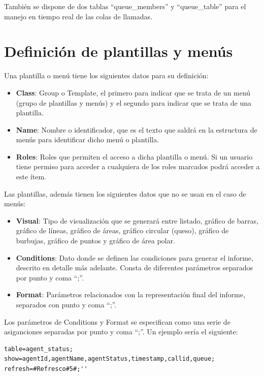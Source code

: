 \documentclass[spanish,12pt]{book}
\begin{document}
También se dispone de dos tablas ``queue\_members'' y ``queue\_table'' para el manejo en tiempo real de las colas de llamadas.

\section{Definición de plantillas y menús}
Una plantilla o menú tiene los siguientes datos para su definición:
\begin{itemize}
\item {\bf Class}: Group o Template, el primero para indicar que se trata de un menú (grupo de plantillas y menús) y el segundo para indicar que se trata de una plantilla.
\item {\bf Name}: Nombre o identificador, que es el texto que saldrá en la estructura de menús para identificar dicho menú o plantilla.
\item {\bf Roles}: Roles que permiten el acceso a dicha plantilla o menú. Si un usuario tiene permiso para acceder a cualquiera de los roles marcados podrá acceder a este ítem.
\end{itemize}

Las plantillas, además tienen los siguientes datos que no se usan en el caso de menús:
\begin{itemize}
\item {\bf Visual}: Tipo de visualización que se generará entre listado, gráfico de barras, gráfico de líneas, gráfico de áreas, gráfico circular (queso), gráfico de burbujas, gráfico de puntos y gráfico de área polar.
\item {\bf Conditions}: Dato donde se definen las condiciones para generar el informe, descrito en detalle más adelante. Consta de diferentes parámetros separados por punto y coma ``;''.
\item {\bf Format}: Parámetros relacionados con la representación final del informe, separados con punto y coma ``;''.
\end{itemize}

Los parámetros de Conditions y Format se especifican como una serie de asiganciones separadas por punto y coma ``;''. Un ejemplo sería el siguiente:
\begin{lstlisting}
table=agent_status;
show=agentId,agentName,agentStatus,timestamp,callid,queue;
refresh=#Refresco#5#;''
\end{lstlisting}
\end{document}
